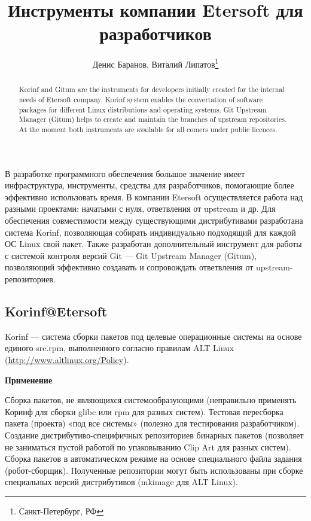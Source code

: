\documentclass[10pt, a5paper]{article}
\begin{document}
\title{Инструменты компании Etersoft для разработчиков}%

\author{Денис Баранов, Виталий Липатов\footnote{Санкт-Петербург, РФ}}
\maketitle

\begin{abstract}
Korinf and Gitum are the instruments for developers initially created for the internal needs of Etersoft company. Korinf system enables the convertation of software packages for different Linux distributions and operating systems. Git Upstream Manager (Gitum) helps to create and maintain the branches of upstream repositories. At the moment both instruments are available for all comers under public licences.
\end{abstract}

В разработке программного обеспечения большое значение имеет инфраструктура, инструменты, средства для разработчиков, помогающие более эффективно использовать время. В компании \linebreak Etersoft осуществляется работа над разными проектами: начатыми с нуля, ответвления от upstream и др. Для обеспечения совместимости между существующими дистрибутивами разработана система Korinf, позволяющая собирать индивидуально подходящий для каждой ОС Linux свой пакет. Также разработан дополнительный инструмент для работы с системой контроля версий Git --- Git Upstream Manager (Gitum), позволяющий эффективно создавать и сопровождать ответвления от upstream-репозиториев.

\subsection*{Korinf@Etersoft}

Korinf --- система сборки пакетов под целевые операционные системы на основе единого src.rpm, выполненного согласно правилам ALT Linux (\url{http://www.altlinux.org/Policy}).

\textbf{Применение}

	Сборка пакетов, не являющихся системообразующими (неправильно применять Коринф для сборки glibc или rpm для разных систем). 
	Тестовая пересборка пакета (проекта) «под все системы» (полезно для тестирования разработчиком). 
	Создание дистрибутиво-специфичных репозиториев бинарных пакетов (позволяет не заниматься пустой работой по упаковыванию Clip Art для разных систем). 
	Сборка пакетов в автоматическом режиме на основе специального файла задания (робот-сборщик). 
	Полученные репозитории могут быть использованы при сборке специальных версий дистрибутивов (mkimage для ALT Linux).
\end{document}
